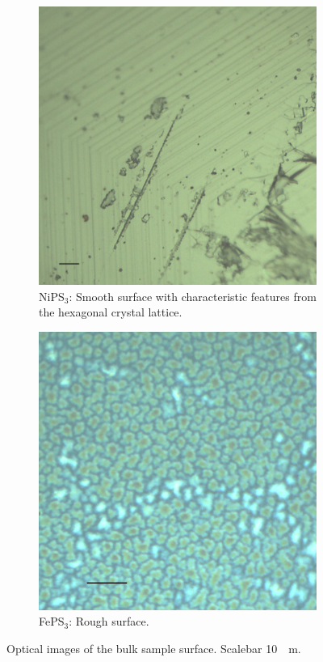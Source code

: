 \documentclass[
	oneside,
	parskip=half,
	a4paper,
]{scrbook}
\begin{document}
\begin{figure}
	\centering
	\begin{subfigure}[t]{.25\textwidth}
		\includegraphics[width=\textwidth]{../../data/2023-11-02/i005_NiPS3_50x-scalebar.png}
		\caption{NiPS$_3$: Smooth surface with characteristic features from the hexagonal crystal lattice.}
		\label{fig:bulk_nips3}
	\end{subfigure}
	\begin{subfigure}[t]{.25\textwidth}
		\includegraphics[width=\textwidth]{../../data/2023-11-02/i009_FePS3_100x-scalebar.png}
		\caption{FePS$_3$: Rough surface.}
		\label{fig:bulk_feps3}
	\end{subfigure}
	\caption{Optical images of the bulk sample surface. Scalebar \SI{10}{\mu m}.}	
\end{figure}
\end{document}
